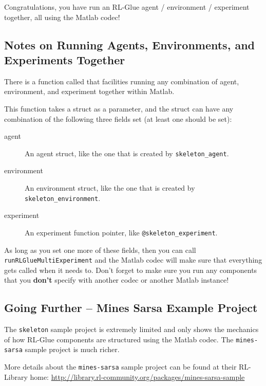 \documentclass[11pt]{article}
\begin{document}
Congratulations, you have run an RL-Glue agent / environment / experiment together, all using the Matlab codec!

\subsection{Notes on Running Agents, Environments, and Experiments Together}
There is a function called  that facilities running any combination of agent, environment, and experiment together within Matlab.

This function takes a struct as a parameter, and the struct can have any combination of the following three fields set (at least one should be set):
\begin{description}
	\item[agent] An agent struct, like the one that is created by \texttt{skeleton\_agent}.
	\item[environment] An environment struct, like the one that is created by \texttt{skeleton\_environment}.
	\item[experiment] An experiment function pointer, like \texttt{@skeleton\_experiment}.
\end{description}

As long as you set one more of these fields, then you can call \texttt{runRLGlueMultiExperiment} and the Matlab codec will make sure that everything gets called when it needs to. Don't forget to make sure you run any components that you \textbf{don't} specify with another codec or another Matlab instance!

\subsection{Going Further -- Mines Sarsa Example Project}
\label{mines-sarsa-sample}
The \texttt{skeleton} sample project is extremely limited and only shows the mechanics of how RL-Glue components are structured using the Matlab codec.  The \texttt{mines-sarsa} sample project is much richer.

More details about the \texttt{mines-sarsa} sample project can be found at their RL-Library home:\newline
\url{http://library.rl-community.org/packages/mines-sarsa-sample}
\end{document}
